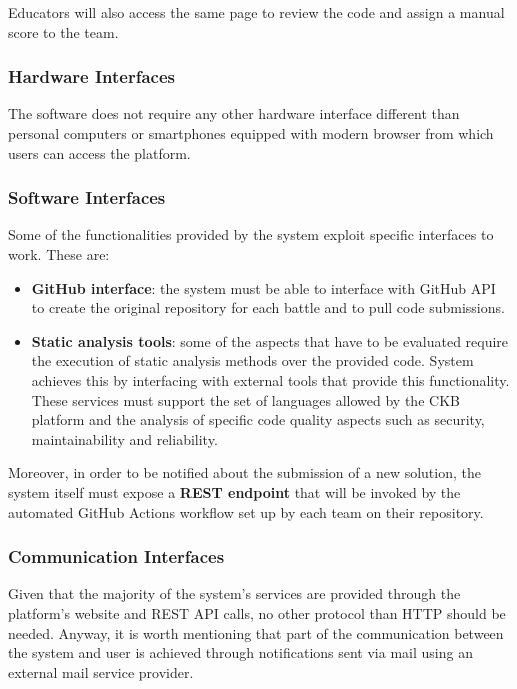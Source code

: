 Educators will also access the same page to review the code and assign a manual score to the team.

\subsubsection{Hardware Interfaces}
The software does not require any other hardware interface different than personal computers or smartphones equipped with modern browser from which users can access the platform.

\subsubsection{Software Interfaces}
Some of the functionalities provided by the system exploit specific interfaces to work. These are:
\begin{itemize}
    \item \textbf{GitHub interface}: the system must be able to interface with GitHub API to create the original repository for each battle and to pull code submissions.
    \item \textbf{Static analysis tools}: some of the aspects that have to be evaluated require the execution of static analysis methods over the provided code. System achieves this by interfacing with external tools that provide this functionality. These services must support the set of languages allowed by the CKB platform and the analysis of specific code quality aspects such as security, maintainability and reliability.
\end{itemize}

Moreover, in order to be notified about the submission of a new solution, the system itself must expose a \textbf{REST endpoint} that will be invoked by the automated GitHub Actions workflow set up by each team on their repository.

\newpage
\subsubsection{Communication Interfaces}
Given that the majority of the system's services are provided through the platform's website and REST API calls, no other protocol than HTTP should be needed. Anyway, it is worth mentioning that part of the communication between the system and user is achieved through notifications sent via mail using an external mail service provider.
\newpage

